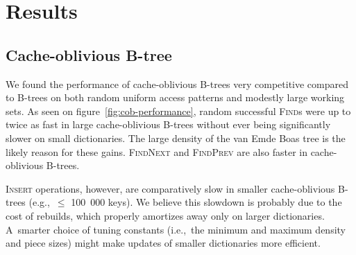 \chapter{Results}
\label{chapter:results}

\section{Cache-oblivious B-tree}
\label{sec:cob-perf}
We found the performance of cache-oblivious B-trees very competitive compared
to B-trees on both random uniform access patterns and modestly large working
sets. As seen on figure~\ref{fig:cob-performance}, random successful
\textsc{Find}s were up to twice as fast in large cache-oblivious B-trees
without ever being significantly slower on small dictionaries.
The large density of the van Emde Boas tree is the likely reason for these
gains.
\textsc{FindNext} and \textsc{FindPrev} are also faster in cache-oblivious
B-trees.

\textsc{Insert} operations, however, are comparatively slow in
smaller cache-oblivious B-trees (e.g.,\ $\leq$ 100~000 keys). We believe
this slowdown is probably due to the cost of rebuilds, which properly
amortizes away only on larger dictionaries. A~smarter choice of tuning
constants (i.e.,\ the minimum and maximum density and piece sizes) might
make updates of smaller dictionaries more efficient.

